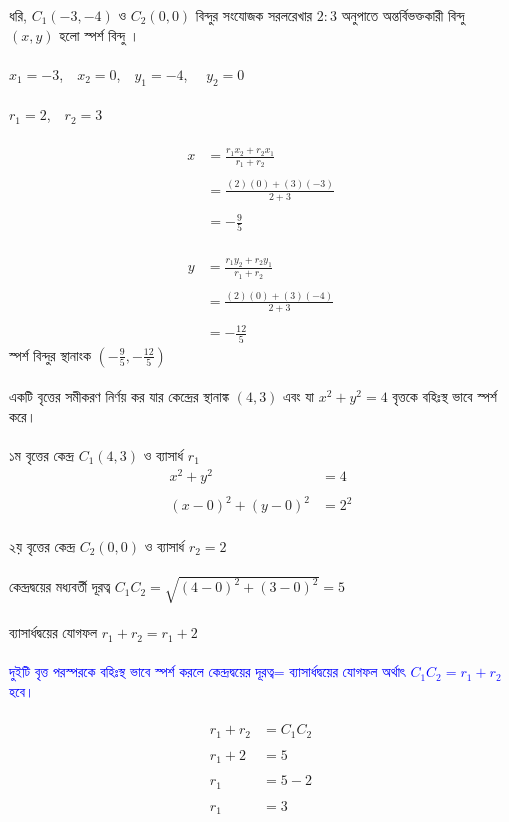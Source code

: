 \documentclass{article}
\begin{document}
 ধরি, $C_1(-3,-4)$ ও $C_2(0,0)$ বিন্দুর সংযোজক সরলরেখার $2:3$ অনুপাতে অন্তর্বিভক্তকারী বিন্দু $(x,y)$ হলো স্পর্শ বিন্দু ।\\
 \\
 $x_1=-3$,\,\,\,\ $x_2=0$,\,\,\,\  $y_1=-4$, \,\,\,\ $y_2=0$\\
 \\
 $r_1=2$,\,\,\,\ $r_2=3$\\
 \\   
 \begin{align*}
 	x&=\frac{r_1x_2+r_2x_1}{r_1+r_2}\\
 	\\
 	&=\frac{(2)(0)+(3)(-3)}{2+3}\\
 	\\
 	&=-\frac{9}{5}
 \end{align*}
\\   
\begin{align*}
	y&=\frac{r_1y_2+r_2y_1}{r_1+r_2}\\
	\\
	&=\frac{(2)(0)+(3)(-4)}{2+3}\\
	\\
	&=-\frac{12}{5}
\end{align*}
স্পর্শ বিন্দুর স্থানাংক $\left(-\frac{9}{5},-\frac{12}{5}\right)$ \\
\\ 
একটি বৃত্তের সমীকরণ নির্ণয় কর যার কেন্দ্রের স্থানাঙ্ক $(4,3)$  এবং যা $x^2+y^2=4$ বৃত্তকে বহিঃস্থ ভাবে স্পর্শ করে। \\
\\
১ম বৃত্তের কেন্দ্র $C_1(4,3)$ ও ব্যাসার্ধ $r_1$
\\
\begin{align*}
x^2+y^2&=4\\
\\
(x-0)^2+(y-0)^2&=2^2
\end{align*}
\\
২য় বৃত্তের কেন্দ্র $C_2(0,0)$ ও ব্যাসার্ধ  $r_2=2$\\
\\ 
কেন্দ্রদ্বয়ের মধ্যবর্তী দূরত্ব  $C_1C_2=\sqrt{(4-0)^2+(3-0)^2}=5$\\ 
\\
ব্যাসার্ধদ্বয়ের যোগফল $r_1+r_2=r_1+2$\\
\\
\textcolor{blue}{	দুইটি বৃত্ত পরস্পরকে বহিঃস্থ ভাবে স্পর্শ করলে কেন্দ্রদ্বয়ের দূরত্ব= ব্যাসার্ধদ্বয়ের যোগফল অর্থাৎ $C_1C_2=r_1+r_2$ হবে। }\\
\\
\begin{align*}
	r_1+r_2&=C_1C_2\\
	\\
	r_1+2&=5\\
	\\
	r_1&=5-2\\
	\\
	r_1&=3
\end{align*}
\end{document}
